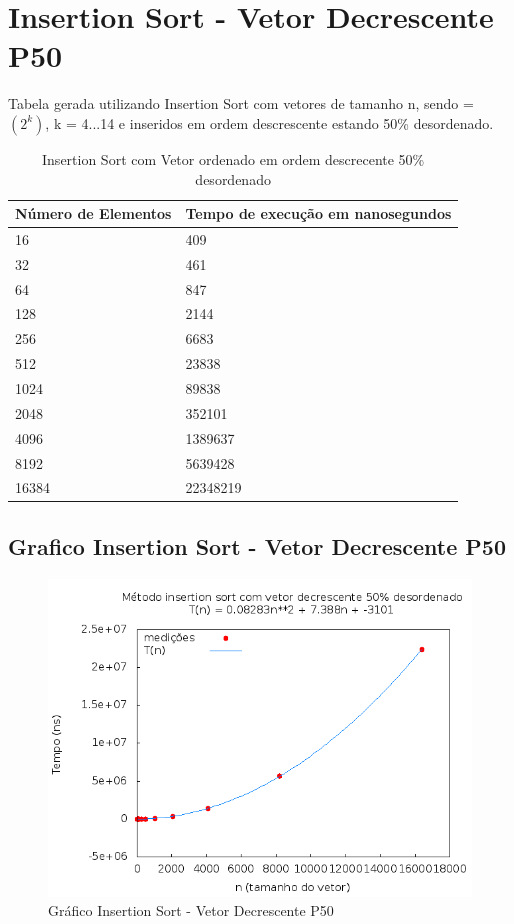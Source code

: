 \documentclass[12pt,a4paper,twoside]{report}
\begin{document}
\section{Insertion Sort - Vetor Decrescente P50}
Tabela gerada utilizando Insertion Sort com vetores de tamanho n, sendo = $(2^k)$, k = 4...14 e inseridos em ordem descrescente estando 50\% desordenado.

\begin{table}[H]
\centering
\caption{Insertion Sort com Vetor ordenado em ordem descrecente 50\% desordenado}
\label{my-label}
\begin{tabular}{|l|l|}
\hline
\multicolumn{1}{|c|}{\textbf{Número de Elementos}} & \multicolumn{1}{c|}{\textbf{Tempo de execução em nanosegundos}} \\ \hline
16 & 409 \\ \hline
32 & 461 \\ \hline
64 & 847 \\ \hline
128 & 2144 \\ \hline
256 & 6683 \\ \hline
512 & 23838 \\ \hline
1024 & 89838 \\ \hline
2048 & 352101 \\ \hline
4096 & 1389637 \\ \hline
8192 & 5639428 \\ \hline
16384 & 22348219 \\ \hline
\end{tabular}
\end{table}

\subsection{Grafico Insertion Sort - Vetor Decrescente P50}
\begin{figure}[H]
    \centering
    \includegraphics[width=0.7\linewidth]{graficos/Insertion/vIntDecrescenteP50/vIntDecrescenteP50.png}
  \caption{Gráfico Insertion Sort - Vetor Decrescente P50}
\end{figure}
\end{document}
